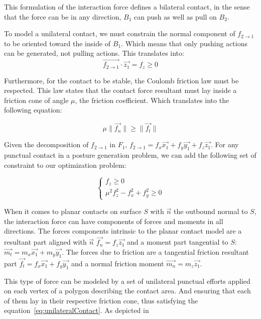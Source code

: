 This formulation of the interaction force defines a bilateral contact, in the sense that the force can be in any direction, $B_1$ can push as well as pull on $B_2$.

To model a unilateral contact, we must constrain the normal component of $f_{2\rightarrow 1}$ to be oriented toward the inside of $B_1$. Which means that only pushing actions can be generated, not pulling actions.
This translates into:
\begin{equation}
  \overrightarrow{f_{2\rightarrow 1}}\cdot \vec{z_1} = f_z \geq 0
\end{equation}

Furthermore, for the contact to be stable, the Coulomb friction law must be respected.
This law states that the contact force resultant must lay inside a friction cone of angle $\mu$, the friction coefficient.
Which translates into the following equation:

\begin{equation}
  \mu\|\vec{f_n}\| \geq \|\vec{f_t}\|
\end{equation}

Given the decomposition of $f_{2\rightarrow 1}$ in $F_1$, $f_{2\rightarrow 1} = f_x \vec{x_1} + f_y \vec{y_1} + f_z \vec{z_1}$.
For any punctual contact in a posture generation problem, we can add the following set of constraint to our optimization problem:

\begin{equation}
  \label{eq:unilateralContact}
  \left\{
  \begin{array}{l}
    f_z \geq 0 \\
    \mu^2 f_z^2 - f_x^2 +f_y^2 \geq 0
  \end{array}
  \right.
\end{equation}

When it comes to planar contacts on surface $S$ with $\vec{n}$ the outbound normal to $S$, the interaction force can have components of forces and moments in all directions.
The forces components intrinsic to the planar contact model are a resultant part aligned with $\vec{n}$ $\vec{f_n} = f_z \vec{z_1}$ and a moment part tangential to $S$: $\vec{m_t} = m_x \vec{x_1} + m_y \vec{y_1}$.
The forces due to friction are a tangential friction resultant part $\vec{f_t} = f_x \vec{x_1} + f_y \vec{y_1}$ and a normal friction moment $\vec{m_n} = m_z \vec{z_1}$.

This type of force can be modeled by a set of unilateral punctual efforts applied on each vertex of a polygon describing the contact area.
And ensuring that each of them lay in their respective friction cone, thus satisfying the equation~\ref{eq:unilateralContact}. As depicted in~

